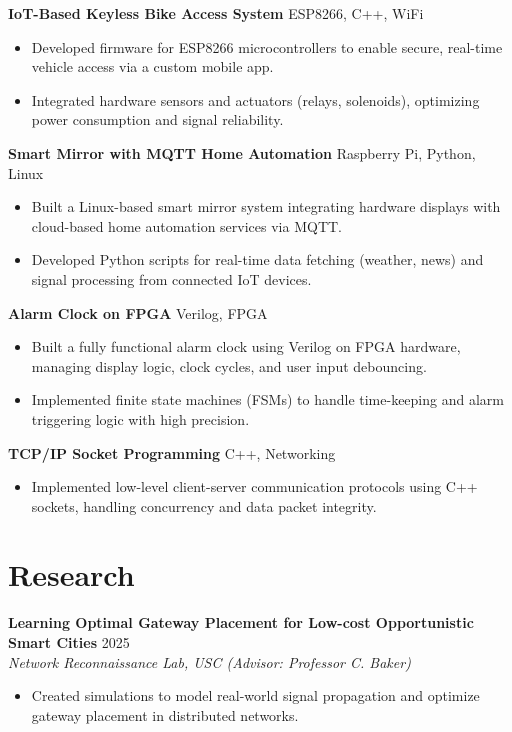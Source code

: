 \documentclass[letterpaper,10pt]{article}
\begin{document}
\textbf{IoT-Based Keyless Bike Access System} \hfill ESP8266, C++, WiFi
\begin{itemize}[leftmargin=*,noitemsep,topsep=-3pt]
    \item Developed firmware for ESP8266 microcontrollers to enable secure, real-time vehicle access via a custom mobile app.
    \item Integrated hardware sensors and actuators (relays, solenoids), optimizing power consumption and signal reliability.
\end{itemize}

\textbf{Smart Mirror with MQTT Home Automation} \hfill Raspberry Pi, Python, Linux
\begin{itemize}[leftmargin=*,noitemsep,topsep=-3pt]
    \item Built a Linux-based smart mirror system integrating hardware displays with cloud-based home automation services via MQTT.
    \item Developed Python scripts for real-time data fetching (weather, news) and signal processing from connected IoT devices.
\end{itemize}

\textbf{Alarm Clock on FPGA} \hfill Verilog, FPGA
\begin{itemize}[leftmargin=*,noitemsep,topsep=-3pt]
    \item Built a fully functional alarm clock using Verilog on FPGA hardware, managing display logic, clock cycles, and user input debouncing.
    \item Implemented finite state machines (FSMs) to handle time-keeping and alarm triggering logic with high precision.
\end{itemize}

\textbf{TCP/IP Socket Programming} \hfill C++, Networking
\begin{itemize}[leftmargin=*,noitemsep,topsep=-3pt]
    \item Implemented low-level client-server communication protocols using C++ sockets, handling concurrency and data packet integrity.
\end{itemize}

\section*{Research}
\textbf{Learning Optimal Gateway Placement for Low-cost Opportunistic Smart Cities} \hfill 2025 \\
\textit{Network Reconnaissance Lab, USC (Advisor: Professor C. Baker)}
\begin{itemize}[leftmargin=*,noitemsep,topsep=-3pt]
    \item Created simulations to model real-world signal propagation and optimize gateway placement in distributed networks.
\end{itemize}
\end{document}
